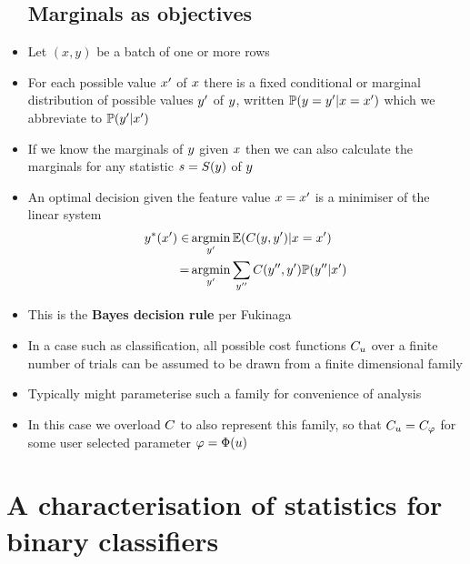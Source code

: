 \documentclass{article}
\begin{document}
\begin{itemize}
\subsection{Marginals as objectives}
  \item
    Let $(x,y)$ be a batch of one or more rows
    \item
      For each possible value $\FeatD$ of $\Feat$ there is a fixed conditional or marginal distribution of possible values $\TargD$ of $\Targ$, written $\Prob(\Targ=\TargD|\Feat=\FeatD)$ which we abbreviate to $\Prob(\TargD|\FeatD)$
  \item
    If we know the marginals of ${y}$ given $\Feat$ then we can also calculate the marginals for any statistic ${s}={S}({y})$ of ${y}$
  \item
    An optimal decision given the feature value $\Feat=\FeatD$ is a minimiser of the linear system
        \begin{align*}
          \PredB(\FeatD)\in&\argmin_{\TargD}\mathbb E(\SCORE(\targ,\TargD)|\Feat=\FeatD)\\
          =&\argmin_{\TargD}\sum_{\TargDD}\SCORE(\TargDD,\TargD)\Prob(\TargDD|\FeatD)
        \end{align*}
      \item
        This is the \textbf{Bayes decision rule} per Fukinaga
        \item
          In a case such as classification, all possible cost functions $\SCORE_\Usr$ over a finite number of trials can be assumed to be drawn from a finite dimensional family
        \item
          Typically might parameterise such a family for convenience of analysis
        \item
          In this case we overload ${C}$ to also represent this family, so that ${C}_u={C}_\varphi$ for some user selected parameter $\varphi=\Phi(\Usr)$
\end{itemize}
\section{A characterisation of statistics for binary classifiers}
\end{document}
